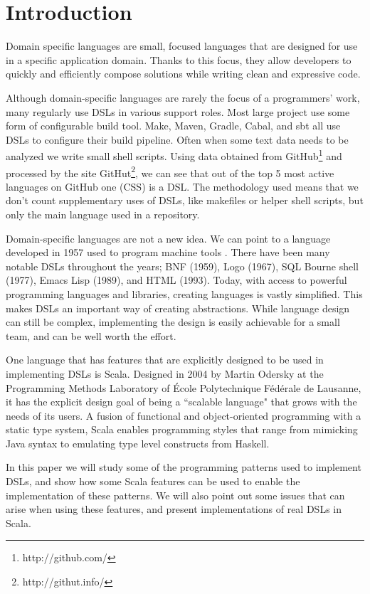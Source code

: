 \chapter{Introduction}

Domain specific languages are small, focused languages that are designed for use in a specific application domain.
Thanks to this focus, they allow developers to quickly and efficiently compose solutions while writing clean and expressive code.

Although domain-specific languages are rarely the focus of a programmers' work, many regularly use DSLs in various support roles.
Most large project use some form of configurable build tool.
Make, Maven, Gradle, Cabal, and sbt all use DSLs to configure their build pipeline.
Often when some text data needs to be analyzed we write small shell scripts.
Using data obtained from GitHub\footnote{http://github.com/} and processed by the site GitHut\footnote{http://githut.info/}, we can see that out of the top 5 most active languages on GitHub one (CSS) is a DSL.
The methodology used means that we don't count supplementary uses of DSLs, like makefiles or helper shell scripts, but only the main language used in a repository.

Domain-specific languages are not a new idea.
We can point to a language developed in 1957 used to program machine tools \cite{Ross:1978}.
There have been many notable DSLs throughout the years; BNF (1959), Logo (1967), SQL Bourne shell (1977), Emacs Lisp (1989), and HTML (1993).
Today, with access to powerful programming languages and libraries, creating languages is vastly simplified.
This makes DSLs an important way of creating abstractions.
While language design can still be complex, implementing the design is easily achievable for a small team, and can be well worth the effort.

One language that has features that are explicitly designed to be used in implementing DSLs is Scala.
Designed in 2004 by Martin Odersky at the Programming Methods Laboratory of \'Ecole Polytechnique F\'ed\'erale de Lausanne, it has the explicit design goal of being a ``scalable language" that grows with the needs of its users.
A fusion of functional and object-oriented programming with a static type system, Scala enables programming styles that range from mimicking Java syntax to emulating type level constructs from Haskell.

In this paper we will study some of the programming patterns used to implement DSLs, and show how some Scala features can be used to enable the implementation of these patterns.
We will also point out some issues that can arise when using these features, and present implementations of real DSLs in Scala.